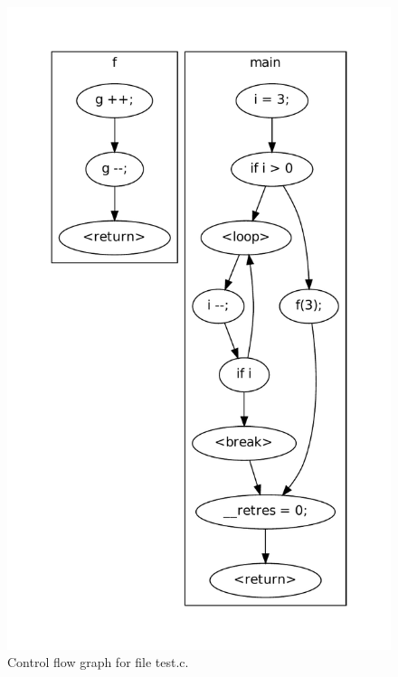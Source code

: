\begin{figure}[htbp]
  \centering
  \begin{minipage}[h]{0.45\linewidth}
  \end{minipage}%
  \begin{minipage}[h]{0.4\linewidth}
    \includegraphics[width=\textwidth]{./tutorial/viewcfg/pdfs/cfg.pdf}
  \end{minipage}

  \caption{Control flow graph for file test.c.}
  \label{fig:tut:basiccfg}
\end{figure}

